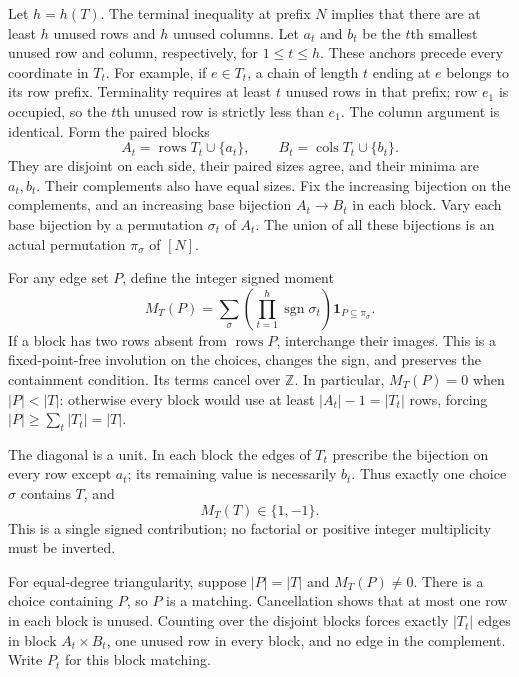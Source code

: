 \documentclass[11pt,a4paper,oneside,openany]{book}
\theoremstyle{definition}\newtheorem{definition}[theorem]{Definition}
\theoremstyle{remark}\newtheorem{remark}[theorem]{Remark}
\numberwithin{equation}{chapter}
\begin{document}
Let $h=h(T)$.  The terminal inequality at prefix $N$ implies that there
are at least $h$ unused rows and $h$ unused columns.  Let $a_t$ and $b_t$
be the $t$th smallest unused row and column, respectively, for
$1\leq t\leq h$.  These anchors precede every coordinate in $T_t$.
For example, if $e\in T_t$, a chain of length $t$ ending at $e$ belongs
to its row prefix.  Terminality requires at least $t$ unused rows in
that prefix; row $e_1$ is occupied, so the $t$th unused row is strictly
less than $e_1$.  The column argument is identical.  Form the paired blocks
\[
 A_t=\operatorname{rows}T_t\cup\{a_t\},\qquad
 B_t=\operatorname{cols}T_t\cup\{b_t\}.
\]
They are disjoint on each side, their paired sizes agree, and their
minima are $a_t,b_t$.  Their complements also have equal sizes.  Fix the
increasing bijection on the complements, and an increasing base bijection
$A_t\to B_t$ in each block.  Vary each base bijection by a permutation
$\sigma_t$ of $A_t$.  The union of all these bijections is an actual
permutation $\pi_\sigma$ of $[N]$.

For any edge set $P$, define the integer signed moment
\[
 M_T(P)=\sum_{\sigma}
     \left(\prod_{t=1}^{h}\operatorname{sgn}\sigma_t\right)
     \boldsymbol{1}_{P\subseteq\pi_\sigma}.
\]
If a block has two rows absent from $\operatorname{rows}P$, interchange
their images.  This is a fixed-point-free involution on the choices,
changes the sign, and preserves the containment condition.  Its terms
cancel over $\mathbb Z$.  In particular, $M_T(P)=0$ when $|P|<|T|$:
otherwise every block would use at least $|A_t|-1=|T_t|$ rows, forcing
$|P|\geq\sum_t|T_t|=|T|$.

The diagonal is a unit.  In each block the edges of $T_t$ prescribe the
bijection on every row except $a_t$; its remaining value is necessarily
$b_t$.  Thus exactly one choice $\sigma$ contains $T$, and
\[
 M_T(T)\in\{1,-1\}.
\]
This is a single signed contribution; no factorial or positive integer
multiplicity must be inverted.

For equal-degree triangularity, suppose $|P|=|T|$ and $M_T(P)\ne0$.
There is a choice containing $P$, so $P$ is a matching.  Cancellation
shows that at most one row in each block is unused.  Counting over the
disjoint blocks forces exactly $|T_t|$ edges in block $A_t\times B_t$,
one unused row in every block, and no edge in the complement.  Write
$P_t$ for this block matching.
\end{document}
